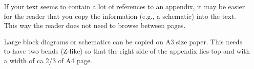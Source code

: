 If your text seems to contain a lot of references to an appendix, it may be easier for the reader that you copy the information (e.g., a schematic) into the text. This way the reader does not need to browse between pages.

Large block diagrams or schematics can be copied on A3 size paper. This needs to have two bends (Z-like) so that the right side of the appendix lies top and with a width of ca 2/3 of A4 page.
